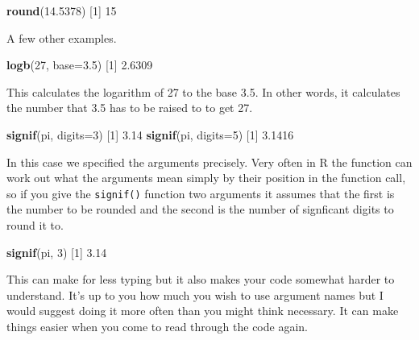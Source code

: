 \documentclass[
]{book}
\newenvironment{Shaded}{\begin{snugshade}}{\end{snugshade}}
\newcommand{\DataTypeTok}[1]{\textcolor[rgb]{0.13,0.29,0.53}{#1}}
\newcommand{\DecValTok}[1]{\textcolor[rgb]{0.00,0.00,0.81}{#1}}
\newcommand{\FloatTok}[1]{\textcolor[rgb]{0.00,0.00,0.81}{#1}}
\newcommand{\KeywordTok}[1]{\textcolor[rgb]{0.13,0.29,0.53}{\textbf{#1}}}
\newcommand{\NormalTok}[1]{#1}
\begin{document}
\begin{Shaded}
\begin{Highlighting}[]
\KeywordTok{round}\NormalTok{(}\FloatTok{14.5378}\NormalTok{)}
\NormalTok{[}\DecValTok{1}\NormalTok{] }\DecValTok{15}
\end{Highlighting}
\end{Shaded}

A few other examples.

\begin{Shaded}
\begin{Highlighting}[]
\KeywordTok{logb}\NormalTok{(}\DecValTok{27}\NormalTok{, }\DataTypeTok{base=}\FloatTok{3.5}\NormalTok{)}
\NormalTok{[}\DecValTok{1}\NormalTok{] }\FloatTok{2.6309}
\end{Highlighting}
\end{Shaded}

This calculates the logarithm of 27 to the base 3.5. In other words, it calculates the number that 3.5 has to be raised to to get 27.

\begin{Shaded}
\begin{Highlighting}[]
\KeywordTok{signif}\NormalTok{(pi, }\DataTypeTok{digits=}\DecValTok{3}\NormalTok{)}
\NormalTok{[}\DecValTok{1}\NormalTok{] }\FloatTok{3.14}
\KeywordTok{signif}\NormalTok{(pi, }\DataTypeTok{digits=}\DecValTok{5}\NormalTok{)}
\NormalTok{[}\DecValTok{1}\NormalTok{] }\FloatTok{3.1416}
\end{Highlighting}
\end{Shaded}

In this case we specified the arguments precisely. Very often in R the function can work out what the arguments mean simply by their position in the function call, so if you give the \texttt{signif()} function two arguments it assumes that the first is the number to be rounded and the second is the number of signficant digits to round it to.

\begin{Shaded}
\begin{Highlighting}[]
\KeywordTok{signif}\NormalTok{(pi, }\DecValTok{3}\NormalTok{)}
\NormalTok{[}\DecValTok{1}\NormalTok{] }\FloatTok{3.14}
\end{Highlighting}
\end{Shaded}

This can make for less typing but it also makes your code somewhat harder to understand. It's up to you how much you wish to use argument names but I would suggest doing it more often than you might think necessary. It can make things easier when you come to read through the code again.
\end{document}
